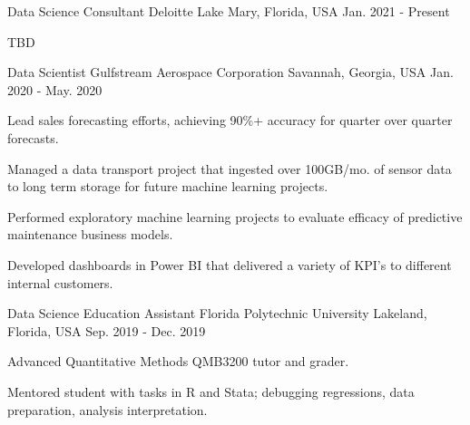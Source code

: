 

\begin{cventries}

  \cventry
    {Data Science Consultant} %
    {Deloitte} %
    {Lake Mary, Florida, USA} %
    {Jan. 2021 - Present} %
    {
      \begin{cvitems} %
        \item {TBD}
      \end{cvitems}
    }

  \cventry
    {Data Scientist} %
    {Gulfstream Aerospace Corporation} %
    {Savannah, Georgia, USA} %
    {Jan. 2020 - May. 2020} %
    {
      \begin{cvitems} %
        \item {Lead sales forecasting efforts, achieving 90\%+ accuracy for quarter over quarter forecasts.}
        \item {Managed a data transport project that ingested over 100GB/mo. of sensor data to long term storage for future machine learning projects.}
        \item {Performed exploratory machine learning projects to evaluate efficacy of predictive maintenance business models.}
        \item {Developed dashboards in Power BI that delivered a variety of KPI's to different internal customers.}
      \end{cvitems}
    }

  \cventry
    {Data Science Education Assistant} %
    {Florida Polytechnic University} %
    {Lakeland, Florida, USA} %
    {Sep. 2019 - Dec. 2019} %
    {
      \begin{cvitems} %
        \item {Advanced Quantitative Methods QMB3200 tutor and grader.}
        \item {Mentored student with tasks in R and Stata; debugging regressions, data preparation, analysis interpretation.}
      \end{cvitems}
    }


\end{cventries}
